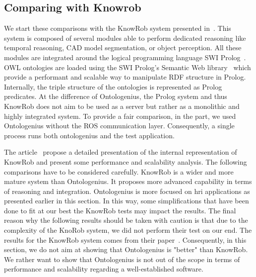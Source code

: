 \subsection{Comparing with Knowrob}

We start these comparisons with the KnowRob system presented in~\cite{tenorth_2013_knowrob}. This system is composed of several modules able to perform dedicated reasoning like temporal reasoning, CAD model segmentation, or object perception. All these modules are integrated around the logical programming language SWI Prolog~\cite{wielemaker_2012_swi}. OWL ontologies are loaded using the SWI Prolog’s Semantic Web library~\cite{wielemaker_2003_prolog} which provide a performant and scalable way to manipulate RDF structure in Prolog. Internally, the triple structure of the ontologies is represented as Prolog predicates. At the difference of Ontologenius, the Prolog system and thus KnowRob does not aim to be used as a server but rather as a monolithic and highly integrated system. To provide a fair comparison, in the part, we used Ontologenius without the ROS communication layer. Consequently, a single process runs both ontologenius and the test application.

The article~\cite{tenorth_2017_representations} propose a detailed presentation of the internal representation of KnowRob and present some performance and scalability analysis. The following comparisons have to be considered carefully. KnowRob is a wider and more mature system than Ontologenius. It proposes more advanced capability in terms of reasoning and integration. Ontologenius is more focused on \acrshort{hri} applications as presented earlier in this section. In this way, some simplifications that have been done to fit at our best the KnowRob tests may impact the results. The final reason why the following results should be taken with caution is that due to the complexity of the KnoRob system, we did not perform their test on our end. The results for the KnowRob system comes from their paper~\cite{tenorth_2017_representations}. Consequently, in this section, we do not aim at showing that Ontologenius is "better" than KnowRob. We rather want to show that Ontologenius is not out of the scope in terms of performance and scalability regarding a well-established software.

